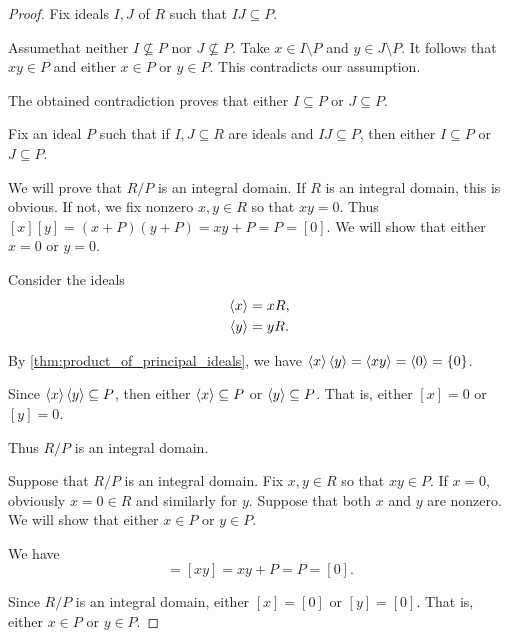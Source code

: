 \begin{proof}
   Fix ideals \( I, J \) of \( R \) such that \( IJ \subseteq P \).

  Assume\LEM that neither \( I \not\subseteq P \) nor \( J \not\subseteq P \). Take \( x \in I \setminus P \) and \( y \in J \setminus P \). It follows that \( xy \in P \) and either \( x \in P \) or \( y \in P \). This contradicts our assumption.

  The obtained contradiction proves that either \( I \subseteq P \) or \( J \subseteq P \).

   Fix an ideal \( P \) such that if \( I, J \subseteq R \) are ideals and \( IJ \subseteq P \), then either \( I \subseteq P \) or \( J \subseteq P \).

  We will prove that \( R / P \) is an integral domain. If \( R \) is an integral domain, this is obvious. If not, we fix nonzero \( x, y \in R \) so that \( xy = 0 \). Thus \( [x][y] = (x + P)(y + P) = xy + P = P = [0] \). We will show that either \( x = 0 \) or \( y = 0 \).

  Consider the ideals
  \begin{align*}
    \left\langle x \right\rangle &= xR, \\
    \left\langle y \right\rangle &= yR.
  \end{align*}

  By \cref{thm:product_of_principal_ideals}, we have \( \left\langle x \right\rangle \left\langle y \right\rangle = \left\langle xy \right\rangle = \left\langle 0 \right\rangle = \{ 0 \} \).

  Since \( \left\langle x \right\rangle \left\langle y \right\rangle \subseteq P \), then either \( \left\langle x \right\rangle \subseteq P \) or \( \left\langle y \right\rangle \subseteq P \). That is, either \( [x] = 0 \) or \( [y] = 0 \).

  Thus \( R / P \) is an integral domain.

   Suppose that \( R / P \) is an integral domain. Fix \( x, y \in R \) so that \( xy \in P \). If \( x = 0 \), obviously \( x = 0 \in R \) and similarly for \( y \). Suppose that both \( x \) and \( y \) are nonzero. We will show that either \( x \in P \) or \( y \in P \).

  We have
  \begin{equation*}
    [x][y] = [xy] = xy + P = P = [0].
  \end{equation*}

  Since \( R / P \) is an integral domain, either \( [x] = [0] \) or \( [y] = [0] \). That is, either \( x \in P \) or \( y \in P \).
\end{proof}

